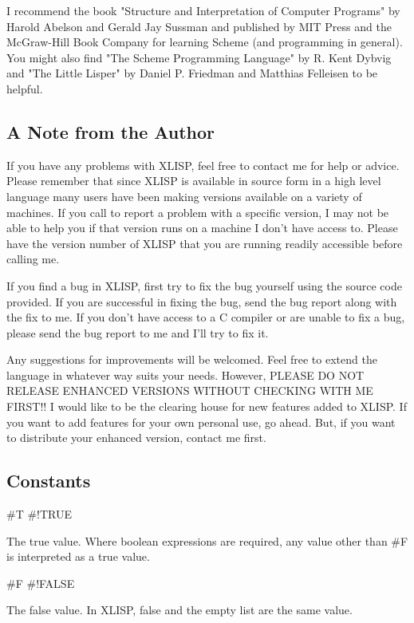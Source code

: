 \documentclass[11pt]{article}
\begin{document}
I recommend the book "Structure and Interpretation of Computer
Programs" by Harold Abelson and Gerald Jay Sussman and published by
MIT Press and the McGraw-Hill Book Company for learning Scheme (and
programming in general). You might also find "The Scheme Programming
Language" by R. Kent Dybvig and "The Little Lisper" by Daniel
P. Friedman and Matthias Felleisen to be helpful.

\subsection{A Note from the Author}
\label{sec-1-2}

If you have any problems with XLISP, feel free to contact me for
help or advice. Please remember that since XLISP is available in
source form in a high level language many users have been making
versions available on a variety of machines. If you call to report a
problem with a specific version, I may not be able to help you if
that version runs on a machine I don't have access to. Please have
the version number of XLISP that you are running readily accessible
before calling me.

If you find a bug in XLISP, first try to fix the bug yourself using
the source code provided. If you are successful in fixing the bug,
send the bug report along with the fix to me. If you don't have
access to a C compiler or are unable to fix a bug, please send the
bug report to me and I'll try to fix it.

Any suggestions for improvements will be welcomed. Feel free to
extend the language in whatever way suits your needs. However,
PLEASE DO NOT RELEASE ENHANCED VERSIONS WITHOUT CHECKING WITH ME
FIRST!! I would like to be the clearing house for new features added
to XLISP. If you want to add features for your own personal use, go
ahead. But, if you want to distribute your enhanced version, contact
me first.

\subsection{Constants}
\label{sec-1-3}

\#T
\#!TRUE

The true value.  Where boolean expressions are required, any value other
than \#F is interpreted as a true value.

\#F
\#!FALSE

The false value.  In XLISP, false and the empty list are the same value.
\end{document}
